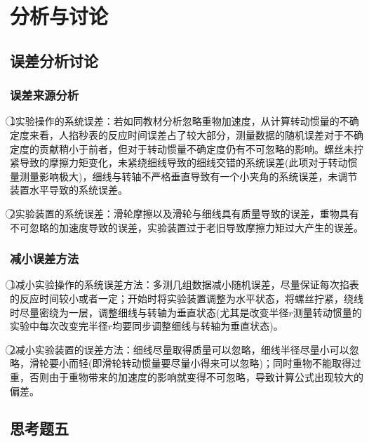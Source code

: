 \documentclass[a4 paper,12pt]{article}
\begin{document}
\section{分析与讨论}
\subsection{误差分析讨论}
\subsubsection{误差来源分析}
\textcircled{1}实验操作的系统误差：若如同教材分析忽略重物加速度，从计算转动惯量的不确定度来看，人掐秒表的反应时间误差占了较大部分，测量数据的随机误差对于不确定度的贡献稍小于前者，但对于转动惯量不确定度仍有不可忽略的影响。螺丝未拧紧导致的摩擦力矩变化，未紧绕细线导致的细线交错的系统误差(此项对于转动惯量测量影响极大)，细线与转轴不严格垂直导致有一个小夹角的系统误差，未调节装置水平导致的系统误差。
\par \textcircled{2}实验装置的系统误差：滑轮摩擦以及滑轮与细线具有质量导致的误差，重物具有不可忽略的加速度导致的误差，实验装置过于老旧导致摩擦力矩过大产生的误差。
\subsubsection{减小误差方法}
\textcircled{1}减小实验操作的系统误差方法：多测几组数据减小随机误差，尽量保证每次掐表的反应时间较小或者一定；开始时将实验装置调整为水平状态，将螺丝拧紧，绕线时尽量密绕为一层，调整细线与转轴为垂直状态(尤其是改变半径$r$测量转动惯量的实验中每次改变完半径$r$均要同步调整细线与转轴为垂直状态)。
\par \textcircled{2}减小实验装置的误差方法：细线尽量取得质量可以忽略，细线半径尽量小可以忽略，滑轮要小而轻(即滑轮转动惯量要尽量小得来可以忽略)；同时重物不能取得过重，否则由于重物带来的加速度的影响就变得不可忽略，导致计算公式出现较大的偏差。
\subsection{思考题五}
\end{document}
